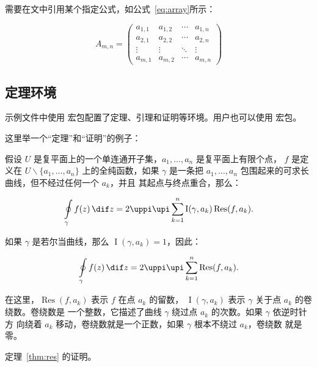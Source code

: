 需要在文中引用某个指定公式，如公式~\ref{eq:array}所示：

\begin{equation}
	A_{m,n} = 
	\begin{pmatrix}
		a_{1,1} & a_{1,2} & \cdots & a_{1,n} \\
		a_{2,1} & a_{2,2} & \cdots & a_{2,n} \\
		\vdots  & \vdots  & \ddots & \vdots  \\
		a_{m,1} & a_{m,2} & \cdots & a_{m,n} 
	\end{pmatrix}\label{eq:array}
\end{equation}

\subsection{定理环境}

示例文件中使用  宏包配置了定理、引理和证明等环境。用户也可以使用 宏包。

这里举一个“定理”和“证明”的例子：
\begin{theorem}[留数定理]\label{thm:res}
  假设 $U$ 是复平面上的一个单连通开子集，$a_1, \ldots, a_n$ 是复平面上有限个点，
  $f$ 是定义在 $U \backslash \{a_1, \ldots, a_n\}$ 上的全纯函数，如果 $\gamma$
  是一条把 $a_1, \ldots, a_n$ 包围起来的可求长曲线，但不经过任何一个 $a_k$，并且
  其起点与终点重合，那么：

  \begin{equation}
    \label{eq:res}
    \ointop_\gamma f(z)\, \dif z = 2\uppi \upi \sum_{k=1}^n \operatorname{I}(\gamma, a_k) \operatorname{Res}(f, a_k).
  \end{equation}

  如果 $\gamma$ 是若尔当曲线，那么 $\operatorname{I}(\gamma, a_k) = 1$，因此：

  \begin{equation}
    \label{eq:resthm}
    \ointop_\gamma f(z)\, \dif z = 2\uppi \upi \sum_{k=1}^n \operatorname{Res}(f, a_k).
  \end{equation}

  在这里，$\operatorname{Res}(f, a_k)$ 表示 $f$ 在点 $a_k$ 的留数，
  $\operatorname{I}(\gamma, a_k)$ 表示 $\gamma$ 关于点 $a_k$ 的卷绕数。卷绕数是
  一个整数，它描述了曲线 $\gamma$ 绕过点 $a_k$ 的次数。如果 $\gamma$ 依逆时针方
  向绕着 $a_k$ 移动，卷绕数就是一个正数，如果 $\gamma$ 根本不绕过 $a_k$，卷绕数
  就是零。
\end{theorem}

定理~\ref{thm:res} 的证明。
	
